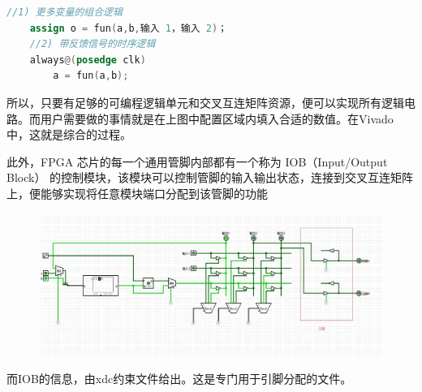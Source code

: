 \documentclass[UTF8]{article}
\begin{document}
	\begin{lstlisting}[language=Verilog]
	//1) 更多变量的组合逻辑
	assign o = fun(a,b,输入 1，输入 2)； 
	//2) 带反馈信号的时序逻辑
	always@(posedge clk) 
		a = fun(a,b);
	\end{lstlisting}\par
	所以，只要有足够的可编程逻辑单元和交叉互连矩阵资源，便可以实现所有逻辑电路。而用户需要做的事情就是在上图中配置区域内填入合适的数值。在Vivado中，这就是综合的过程。\par
	此外，FPGA 芯片的每一个通用管脚内部都有一个称为 IOB（Input/Output Block） 的控制模块，该模块可以控制管脚的输入输出状态，连接到交叉互连矩阵上，便能够实现将任意模块端口分配到该管脚的功能\par
	\begin{figure}[H]
		\centering
		\includegraphics[width=1\linewidth]{s4_3.jpg}
		\label{s4_3}
	\end{figure}
	而IOB的信息，由xdc约束文件给出。这是专门用于引脚分配的文件。\par
	
\end{document}
